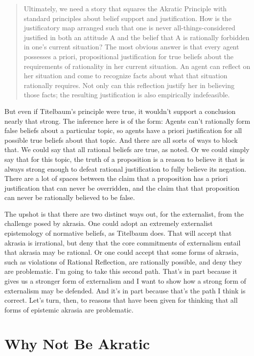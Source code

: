\begin{quote}
Ultimately, we need a story that squares the Akratic Principle with standard principles about belief support and justification. How is the justificatory map arranged such that one is never all-things-considered justified in both an attitude A and the belief that A is rationally forbidden in one's current situation? The most obvious answer is that every agent possesses a priori, propositional justification for true beliefs about the requirements of rationality in her current situation. An agent can reflect on her situation and come to recognize facts about what that situation rationally requires. Not only can this reflection justify her in believing those facts; the resulting justification is also empirically indefeasible. ~\citep[276]{Titelbaum2015}
\end{quote}
But even if Titelbaum's principle were true, it wouldn't support a conclusion nearly that strong. The inference here is of the form: Agents can't rationally form false beliefs about a particular topic, so agents have a priori justification for all possible true beliefs about that topic. And there are all sorts of ways to block that. We could say that all rational beliefs are true, as noted. Or we could simply say that for this topic, the truth of a proposition is a reason to believe it that is always strong enough to defeat rational justification to fully believe its negation. There are a lot of spaces between the claim that a proposition has a priori justification that can never be overridden, and the claim that that proposition can never be rationally believed to be false.

The upshot is that there are two distinct ways out, for the externalist, from the challenge posed by akrasia. One could adopt an extremely externalist epistemology of normative beliefs, as Titelbaum does. That will accept that akrasia is irrational, but deny that the core commitments of externalism entail that akrasia may be rational. Or one could accept that some forms of akrasia, such as violations of Rational Reflection, are rationally possible, and deny they are problematic. I'm going to take this second path. That's in part because it gives us a stronger form of externalism and I want to show how a strong form of externalism may be defended. And it's in part because that's the path I think is correct. Let's turn, then, to reasons that have been given for thinking that all forms of epistemic akrasia are problematic.

\section{Why Not Be Akratic}
\label{whynotbeakratic}

